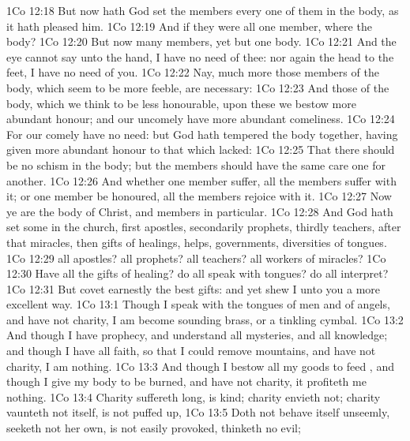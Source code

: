 \vs 1Co 12:18 But now hath God set the members every one of them in the body, as it hath pleased him.
\vs 1Co 12:19 And if they were all one member, where  the body?
\vs 1Co 12:20 But now  many members, yet but one body.
\vs 1Co 12:21 And the eye cannot say unto the hand, I have no need of thee: nor again the head to the feet, I have no need of you.
\vs 1Co 12:22 Nay, much more those members of the body, which seem to be more feeble, are necessary:
\vs 1Co 12:23 And those  of the body, which we think to be less honourable, upon these we bestow more abundant honour; and our uncomely  have more abundant comeliness.
\vs 1Co 12:24 For our comely  have no need: but God hath tempered the body together, having given more abundant honour to that  which lacked:
\vs 1Co 12:25 That there should be no schism in the body; but  the members should have the same care one for another.
\vs 1Co 12:26 And whether one member suffer, all the members suffer with it; or one member be honoured, all the members rejoice with it.
\vs 1Co 12:27 Now ye are the body of Christ, and members in particular.
\vs 1Co 12:28 And God hath set some in the church, first apostles, secondarily prophets, thirdly teachers, after that miracles, then gifts of healings, helps, governments, diversities of tongues.
\vs 1Co 12:29  all apostles?  all prophets?  all teachers?  all workers of miracles?
\vs 1Co 12:30 Have all the gifts of healing? do all speak with tongues? do all interpret?
\vs 1Co 12:31 But covet earnestly the best gifts: and yet shew I unto you a more excellent way.
\vs 1Co 13:1 Though I speak with the tongues of men and of angels, and have not charity, I am become  sounding brass, or a tinkling cymbal.
\vs 1Co 13:2 And though I have  prophecy, and understand all mysteries, and all knowledge; and though I have all faith, so that I could remove mountains, and have not charity, I am nothing.
\vs 1Co 13:3 And though I bestow all my goods to feed , and though I give my body to be burned, and have not charity, it profiteth me nothing.
\vs 1Co 13:4 Charity suffereth long,  is kind; charity envieth not; charity vaunteth not itself, is not puffed up,
\vs 1Co 13:5 Doth not behave itself unseemly, seeketh not her own, is not easily provoked, thinketh no evil;
